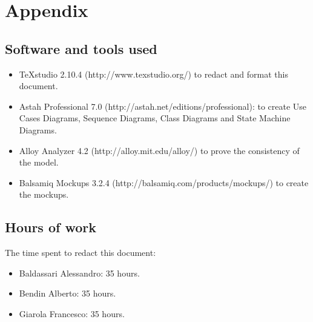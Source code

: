 \documentclass[a4paper,11pt]{report} %
\begin{document}
	\pagebreak	
	
	\section{Appendix}
	
	\subsection{Software and tools used}
	\begin{itemize}
		\item TeXstudio 2.10.4 (http://www.texstudio.org/) to redact and format this document.
		\item Astah Professional 7.0 (http://astah.net/editions/professional): to create Use
		Cases Diagrams, Sequence Diagrams, Class Diagrams and State Machine	Diagrams.
		\item Alloy Analyzer 4.2 (http://alloy.mit.edu/alloy/) to prove the consistency of
		the model.
		\item Balsamiq Mockups 3.2.4 (http://balsamiq.com/products/mockups/) to create the mockups.
	\end{itemize}
	
	\subsection{Hours of work} The time spent to redact this document:
	\begin{itemize}
		\item Baldassari Alessandro: 35 hours.
		\item Bendin Alberto: 35 hours.
		\item Giarola Francesco: 35 hours.
	\end{itemize}
	
	
\end{document}
